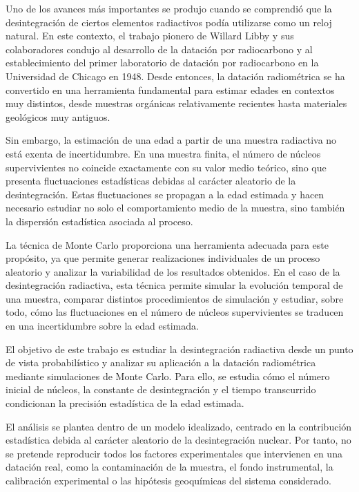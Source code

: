 \documentclass[12pt,a4paper]{article}
\newcommand{\refmargen}[2]{%
  \marginnote{%
    \makebox[\marginparwidth][l]{%
      \parbox[t]{1.7cm}{%
        \scriptsize\raggedright\textbf{#1}\\[-0.2em] #2%
      }%
    }%
  }%
}
\begin{document}
Uno de los avances más importantes se produjo cuando se comprendió que la desintegración de ciertos elementos radiactivos podía utilizarse como un reloj natural. \refmargen{Walker, Mike \cite{walker2005quaternary}}{\S 1.2} En este contexto, el trabajo pionero de Willard Libby y sus colaboradores condujo al desarrollo de la datación por radiocarbono y al establecimiento del primer laboratorio de datación por radiocarbono en la Universidad de Chicago en 1948. Desde entonces, la datación radiométrica se ha convertido en una herramienta fundamental para estimar edades en contextos muy distintos, desde muestras orgánicas relativamente recientes hasta materiales geológicos muy antiguos.

Sin embargo, la estimación de una edad a partir de una muestra radiactiva no está exenta de incertidumbre. En una muestra finita, el número de núcleos supervivientes no coincide exactamente con su valor medio teórico, sino que presenta fluctuaciones estadísticas debidas al carácter aleatorio de la desintegración. Estas fluctuaciones se propagan a la edad estimada y hacen necesario estudiar no solo el comportamiento medio de la muestra, sino también la dispersión estadística asociada al proceso.

La técnica de Monte Carlo proporciona una herramienta adecuada para este propósito, ya que permite generar realizaciones individuales de un proceso aleatorio y analizar la variabilidad de los resultados obtenidos. En el caso de la desintegración radiactiva, esta técnica permite simular la evolución temporal de una muestra, comparar distintos procedimientos de simulación y estudiar, sobre todo, cómo las fluctuaciones en el número de núcleos supervivientes se traducen en una incertidumbre sobre la edad estimada.

El objetivo de este trabajo es estudiar la desintegración radiactiva desde un punto de vista probabilístico y analizar su aplicación a la datación radiométrica mediante simulaciones de Monte Carlo. Para ello, se estudia cómo el número inicial de núcleos, la constante de desintegración y el tiempo transcurrido condicionan la precisión estadística de la edad estimada.

El análisis se plantea dentro de un modelo idealizado, centrado en la contribución estadística debida al carácter aleatorio de la desintegración nuclear. Por tanto, no se pretende reproducir todos los factores experimentales que intervienen en una datación real, como la contaminación de la muestra, el fondo instrumental, la calibración experimental o las hipótesis geoquímicas del sistema considerado.
\end{document}
